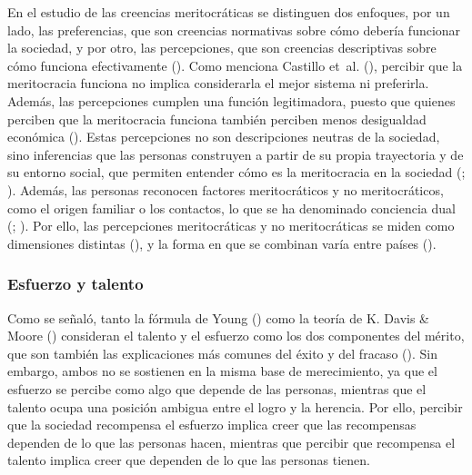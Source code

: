 \documentclass[
  spanish,
  a4paper,
  oneside]{scrbook}
\begin{document}
En el estudio de las creencias meritocráticas se distinguen dos
enfoques, por un lado, las preferencias, que son creencias normativas
sobre cómo debería funcionar la sociedad, y por otro, las percepciones,
que son creencias descriptivas sobre cómo funciona efectivamente
().
Como menciona Castillo et~al.
(), percibir que la
meritocracia funciona no implica considerarla el mejor sistema ni
preferirla. Además, las percepciones cumplen una función legitimadora,
puesto que quienes perciben que la meritocracia funciona también
perciben menos desigualdad económica
(). Estas percepciones no son descripciones neutras de la sociedad,
sino inferencias que las personas construyen a partir de su propia
trayectoria y de su entorno social, que permiten entender cómo es la
meritocracia en la sociedad (; ).
Además, las personas reconocen factores meritocráticos y no
meritocráticos, como el origen familiar o los contactos, lo que se ha
denominado conciencia dual
(;
). Por ello,
las percepciones meritocráticas y no meritocráticas se miden como
dimensiones distintas
(), y la forma en que se combinan varía entre países
().

\subsubsection{Esfuerzo y talento}\label{esfuerzo-y-talento}

Como se señaló, tanto la fórmula de Young
() como la teoría de K. Davis \& Moore
() consideran el talento y el
esfuerzo como los dos componentes del mérito, que son también las
explicaciones más comunes del éxito y del fracaso
(). Sin
embargo, ambos no se sostienen en la misma base de merecimiento, ya que
el esfuerzo se percibe como algo que depende de las personas, mientras
que el talento ocupa una posición ambigua entre el logro y la herencia.
Por ello, percibir que la sociedad recompensa el esfuerzo implica creer
que las recompensas dependen de lo que las personas hacen, mientras que
percibir que recompensa el talento implica creer que dependen de lo que
las personas tienen.
\end{document}
